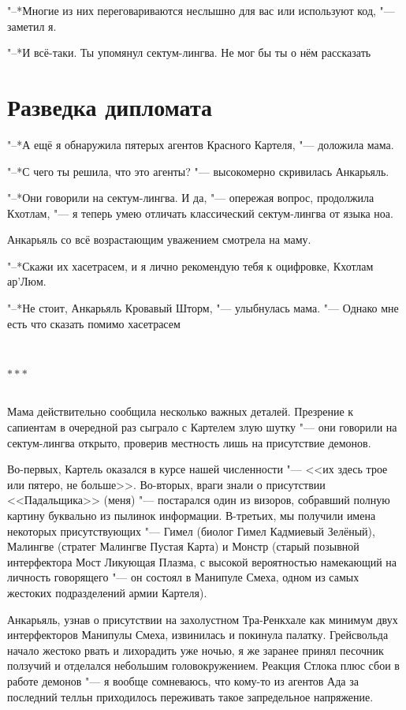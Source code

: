 \documentclass[a4paper,10pt]{book}
\newcommand{\ldotst}{\so{...}\xspace}
\newcommand{\ldotsq}{\so{?\hbox{\hspace{-.212em}}..}\xspace}
\newcommand{\razd}{~\\{\centering\Large\bfseries$\ast \ast \ast$\par}~\\}
\begin{document}
"--*Многие из них переговариваются неслышно для вас или используют код, "--- 
заметил я.

"--*И всё-таки. Ты упомянул сектум-лингва. Не мог бы ты о нём рассказать\ldotsq

\section{Разведка дипломата}

"--*А ещё я обнаружила пятерых агентов Красного Картеля, "--- доложила мама.

"--*С чего ты решила, что это агенты? "--- высокомерно скривилась Анкарьяль.

"--*Они говорили на сектум-лингва. И да, "--- опережая вопрос, продолжила 
Кхотлам, "--- я теперь умею отличать классический сектум-лингва от языка ноа.

Анкарьяль со всё возрастающим уважением смотрела на маму.

"--*Скажи их хасетрасем, и я лично рекомендую тебя к оцифровке, Кхотлам ар'Люм.

"--*Не стоит, Анкарьяль Кровавый Шторм, "--- улыбнулась мама. "--- Однако мне 
есть что сказать помимо хасетрасем\ldotst

\razd

Мама действительно сообщила несколько важных деталей. Презрение к сапиентам в 
очередной раз сыграло с Картелем злую шутку "--- они говорили на сектум-лингва 
открыто, проверив местность лишь на присутствие демонов. 

Во-первых, Картель оказался в курсе нашей численности "--- <<их здесь трое или 
пятеро, не больше>>. Во-вторых, враги знали о присутствии <<Падальщика>> (меня) 
"--- постарался один из визоров, собравший полную картину буквально из пылинок 
информации. В-третьих, мы получили имена некоторых присутствующих "--- Гимел 
(биолог Гимел Кадмиевый Зелёный), Малингве (стратег Малингве Пустая Карта) и 
Монстр (старый позывной интерфектора Мост Ликующая Плазма, с высокой 
вероятностью намекающий на личность говорящего "--- он состоял в Манипуле 
Смеха, одном из самых жестоких подразделений армии Картеля).

Анкарьяль, узнав о присутствии на захолустном Тра-Ренкхале как минимум двух 
интерфекторов Манипулы Смеха, извинилась и покинула палатку. Грейсвольда начало 
жестоко рвать и лихорадить уже ночью, я же заранее принял песочник ползучий и 
отделался небольшим головокружением. Реакция Стлока плюс сбои в работе демонов 
"--- я вообще сомневаюсь, что кому-то из агентов Ада за последний телльн 
приходилось переживать такое запредельное напряжение.
\end{document}
